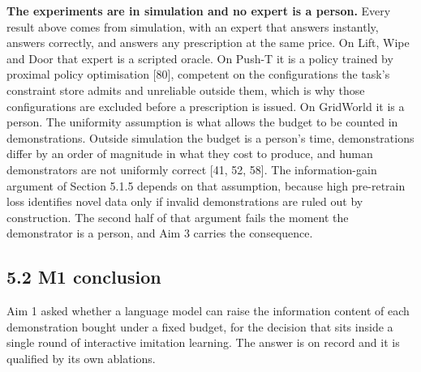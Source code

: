 \documentclass[
  11pt,
]{article}
\begin{document}
\textbf{The experiments are in simulation and no expert is a person.}
Every result above comes from simulation, with an expert that answers
instantly, answers correctly, and answers any prescription at the same
price. On Lift, Wipe and Door that expert is a scripted oracle. On
Push-T it is a policy trained by proximal policy optimisation {[}80{]},
competent on the configurations the task's constraint store admits and
unreliable outside them, which is why those configurations are excluded
before a prescription is issued. On GridWorld it is a person. The
uniformity assumption is what allows the budget to be counted in
demonstrations. Outside simulation the budget is a person's time,
demonstrations differ by an order of magnitude in what they cost to
produce, and human demonstrators are not uniformly correct {[}41, 52,
58{]}. The information-gain argument of Section 5.1.5 depends on that
assumption, because high pre-retrain loss identifies novel data only if
invalid demonstrations are ruled out by construction. The second half of
that argument fails the moment the demonstrator is a person, and Aim 3
carries the consequence.

\hypertarget{m1-conclusion}{%
\subsection{5.2 M1 conclusion}\label{m1-conclusion}}

Aim 1 asked whether a language model can raise the information content
of each demonstration bought under a fixed budget, for the decision that
sits inside a single round of interactive imitation learning. The answer
is on record and it is qualified by its own ablations.
\end{document}
